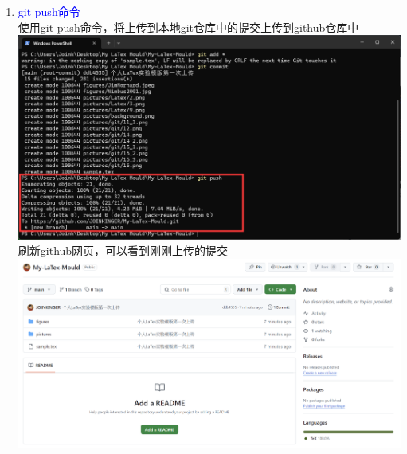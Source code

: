\documentclass[12pt,a4paper,UTF8]{article}
\begin{document}
\begin{enumerate}
        \item \textcolor{blue}{git push命令}\\
        使用git push命令，将上传到本地git仓库中的提交上传到github仓库中\\[6pt]
        \includegraphics[scale=0.25]{pictures/git/19_1.png}\\
        刷新github网页，可以看到刚刚上传的提交\\[6pt]
        \includegraphics[scale=0.25]{pictures/git/19_2.png}    
        

\end{enumerate}
\end{document}

